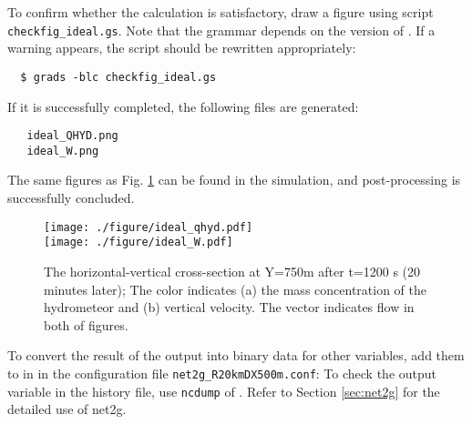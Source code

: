To confirm whether the calculation is satisfactory,
draw a figure using \grads script \verb|checkfig_ideal.gs|.
Note that the grammar depends on the version of \grads.
If a warning appears, the \grads script should be rewritten appropriately:
\begin{verbatim}
  $ grads -blc checkfig_ideal.gs
\end{verbatim}
If it is successfully completed, the following files are generated:

\begin{verbatim}
   ideal_QHYD.png
   ideal_W.png
\end{verbatim}
The same figures as Fig. \ref{fig_ideal} can be found in the simulation,
and post-processing is successfully concluded.

\begin{figure}[htb]
\begin{center}
  \texttt{[image: ./figure/ideal\_qhyd.pdf]}\\
  \texttt{[image: ./figure/ideal\_W.pdf]}\\
  \caption{The horizontal-vertical cross-section at Y=750m after t=1200 s (20 minutes later);
            The color indicates (a) the mass concentration of the hydrometeor and (b) vertical velocity. The vector indicates flow in both of figures.}
  \label{fig_ideal}
\end{center}
\end{figure}

To convert the result of the output into binary data for other variables,
add them to  in  in the configuration file \verb|net2g_R20kmDX500m.conf|:
To check the output variable in the history file, use \verb|ncdump| of {\netcdf}.
Refer to Section \ref{sec:net2g} for the detailed use of net2g.

